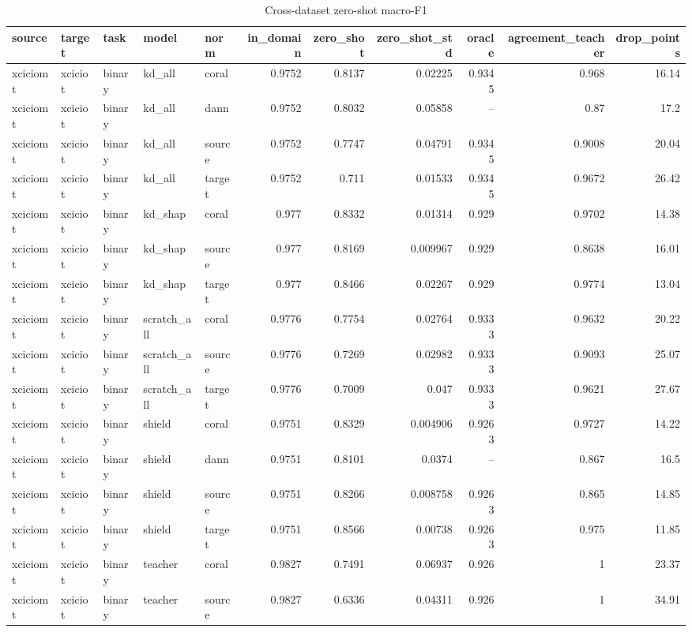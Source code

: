 \begin{table}
\caption{Cross-dataset zero-shot macro-F1}
\begin{tabular}{lllllrrrrrr}
\toprule
source & target & task & model & norm & in_domain & zero_shot & zero_shot_std & oracle & agreement_teacher & drop_points \\
\midrule
xciciomt & xciciot & binary & kd_all & coral & 0.9752 & 0.8137 & 0.02225 & 0.9345 & 0.968 & 16.14 \\
xciciomt & xciciot & binary & kd_all & dann & 0.9752 & 0.8032 & 0.05858 & -- & 0.87 & 17.2 \\
xciciomt & xciciot & binary & kd_all & source & 0.9752 & 0.7747 & 0.04791 & 0.9345 & 0.9008 & 20.04 \\
xciciomt & xciciot & binary & kd_all & target & 0.9752 & 0.711 & 0.01533 & 0.9345 & 0.9672 & 26.42 \\
xciciomt & xciciot & binary & kd_shap & coral & 0.977 & 0.8332 & 0.01314 & 0.929 & 0.9702 & 14.38 \\
xciciomt & xciciot & binary & kd_shap & source & 0.977 & 0.8169 & 0.009967 & 0.929 & 0.8638 & 16.01 \\
xciciomt & xciciot & binary & kd_shap & target & 0.977 & 0.8466 & 0.02267 & 0.929 & 0.9774 & 13.04 \\
xciciomt & xciciot & binary & scratch_all & coral & 0.9776 & 0.7754 & 0.02764 & 0.9333 & 0.9632 & 20.22 \\
xciciomt & xciciot & binary & scratch_all & source & 0.9776 & 0.7269 & 0.02982 & 0.9333 & 0.9093 & 25.07 \\
xciciomt & xciciot & binary & scratch_all & target & 0.9776 & 0.7009 & 0.047 & 0.9333 & 0.9621 & 27.67 \\
xciciomt & xciciot & binary & shield & coral & 0.9751 & 0.8329 & 0.004906 & 0.9263 & 0.9727 & 14.22 \\
xciciomt & xciciot & binary & shield & dann & 0.9751 & 0.8101 & 0.0374 & -- & 0.867 & 16.5 \\
xciciomt & xciciot & binary & shield & source & 0.9751 & 0.8266 & 0.008758 & 0.9263 & 0.865 & 14.85 \\
xciciomt & xciciot & binary & shield & target & 0.9751 & 0.8566 & 0.00738 & 0.9263 & 0.975 & 11.85 \\
xciciomt & xciciot & binary & teacher & coral & 0.9827 & 0.7491 & 0.06937 & 0.926 & 1 & 23.37 \\
xciciomt & xciciot & binary & teacher & source & 0.9827 & 0.6336 & 0.04311 & 0.926 & 1 & 34.91 \\

\end{tabular}
\end{table}
